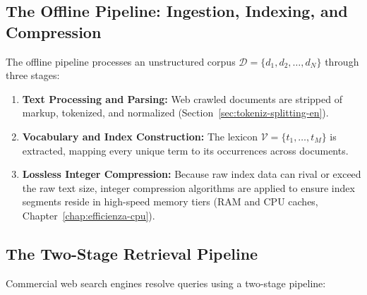 \subsection{The Offline Pipeline: Ingestion, Indexing, and Compression}
The offline pipeline processes an unstructured corpus $\mathcal{D} = \{d_1, d_2, \dots, d_N\}$ through three stages:
\begin{enumerate}
    \item \textbf{Text Processing and Parsing:} Web crawled documents are stripped of markup, tokenized, and normalized (Section~\ref{sec:tokeniz-splitting-en}).
    \item \textbf{Vocabulary and Index Construction:} The lexicon $\mathcal{V} = \{t_1, \dots, t_M\}$ is extracted, mapping every unique term to its occurrences across documents.
    \item \textbf{Lossless Integer Compression:} Because raw index data can rival or exceed the raw text size, integer compression algorithms are applied to ensure index segments reside in high-speed memory tiers (RAM and CPU caches, Chapter~\ref{chap:efficienza-cpu}).
\end{enumerate}

\subsection{The Two-Stage Retrieval Pipeline}
Commercial web search engines resolve queries using a two-stage pipeline:

